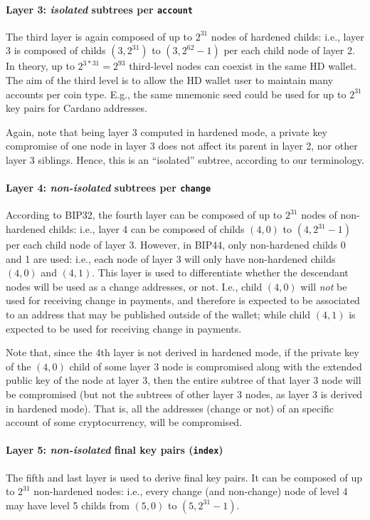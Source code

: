 \paragraph{Layer 3: \emph{isolated} subtrees per \texttt{account}} %
The third layer is again composed of up to $2^{31}$ nodes of hardened childs:
i.e., layer 3 is composed of childs $(3,2^{31})$ to $(3,2^{62}-1)$ per each child
node of layer 2. In theory, up to $2^{3*31}=2^{93}$ third-level nodes can
coexist in the same HD wallet. The aim of the third level is to allow the HD
wallet user to maintain many accounts per coin type. E.g., the same mnemonic
seed could be used for up to $2^{31}$ key pairs for Cardano addresses.

Again, note that being layer 3 computed in hardened mode, a private key compromise
of one node in layer 3 does not affect its parent in layer 2, nor other layer 3
siblings. Hence, this is an ``isolated'' subtree, according to our terminology.

\paragraph{Layer 4: \emph{non-isolated} subtrees per \texttt{change}}
According to BIP32, the fourth layer can be composed of up to  $2^{31}$ nodes of
non-hardened childs: i.e., layer 4 can be composed of childs $(4,0)$ to
$(4,2^{31}-1)$ per each child node of layer 3. However, in BIP44, only
non-hardened childs 0 and 1 are used: i.e., each node of layer 3 will only have
non-hardened childs $(4,0)$ and $(4,1)$. This layer is used to differentiate
whether the descendant nodes will be used as a change addresses, or not. I.e.,
child $(4,0)$ will \emph{not} be used for receiving change in payments, and
therefore is expected to be associated to an address that may be published
outside of the wallet; while child $(4,1)$ is expected to be used for receiving
change in payments.

Note that, since the 4th layer is not derived in hardened mode, if the private
key of the $(4,0)$ child of some layer 3 node is compromised along with the
extended public key of the node at layer 3, then the entire subtree of that
layer 3 node will be compromised (but not the subtrees of other layer 3 nodes,
as layer 3 is derived in hardened mode). That is, all the addresses (change or
not) of an specific account of some cryptocurrency, will be compromised.

\paragraph{Layer 5: \emph{non-isolated} final key pairs (\texttt{index})} %
The fifth and last layer is used to derive final key pairs. It can be composed
of up to $2^{31}$ non-hardened nodes: i.e., every change (and non-change) node
of level 4 may have level 5 childs from $(5,0)$ to $(5,2^{31}-1)$.

